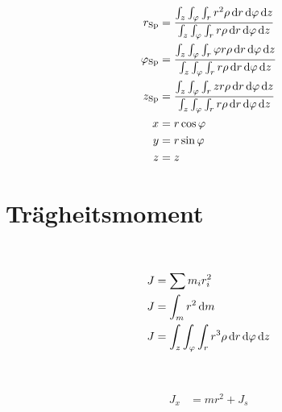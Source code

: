 \begin{boxleft}
\end{boxleft}\begin{boxrightshaded}
\begin{align}
r_{\text{Sp}}&=\frac{\int_z\int_\varphi\int_r r^2\rho \diff r \diff \varphi \diff z }{\int_z\int_\varphi\int_r r\rho \diff r \diff \varphi \diff z }\\
\varphi_{\text{Sp}}&=\frac{\int_z\int_\varphi\int_r \varphi r\rho \diff r \diff \varphi \diff z }{\int_z\int_\varphi\int_r r\rho \diff r \diff \varphi \diff z }\\
z_{\text{Sp}}&=\frac{\int_z\int_\varphi\int_r z r\rho \diff r \diff \varphi \diff z }{\int_z\int_\varphi\int_r r\rho \diff r \diff \varphi \diff z }\\
x&=r\cos{\varphi}\\
y&=r\sin{\varphi}\\
z&=z
\end{align}
\end{boxrightshaded}

\section{Trägheitsmoment}


\begin{boxleft}
\\
\end{boxleft}\begin{boxrightshaded}
\begin{align}
J&=\sum m_i r_i^2\\
J&=\int_m r^2 \mathop{}\!\mathrm{d} m \\
J&=\int_z\int_\varphi\int_r r^3\rho \mathop{}\!\mathrm{d} r \mathop{}\!\mathrm{d} \varphi \mathop{}\!\mathrm{d} z 
\end{align}
\end{boxrightshaded}

\begin{boxleft}
\\
\end{boxleft}\begin{boxrightshaded}
\begin{align}
J_x&=mr^2+J_s
\end{align}
\end{boxrightshaded}

